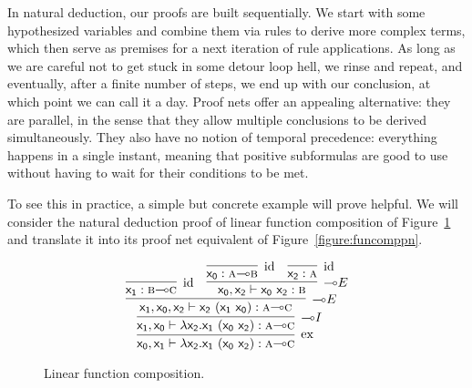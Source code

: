 In natural deduction, our proofs are built sequentially.
We start with some hypothesized variables and combine them via rules to derive more complex terms, which then serve as premises for a next iteration of rule applications.
As long as we are careful not to get stuck in some detour loop hell, we rinse and repeat, and eventually, after a finite number of steps, we end up with our conclusion, at which point we can call it a day.
Proof nets offer an appealing alternative: they are parallel, in the sense that they allow multiple conclusions to be derived simultaneously.
They also have no notion of temporal precedence: everything happens in a single instant, meaning that positive subformulas are good to use without having to wait for their conditions to be met.

To see this in practice, a simple but concrete example will prove helpful.
We will consider the natural deduction proof of linear function composition of Figure~\ref{figure:funcomp} and translate it into its proof net equivalent of Figure~\ref{figure:funcomppn}.

\begin{figure}
	\[
		\infer[\Exchange]{\term{x_0}, \term{x_1} \vdash \term{\lambda x_2.x_1~(x_0~x_2)}: \prop{A} \li \prop{C}}{
			\infer[\li I]{\term{x_1}, \term{x_0} \vdash \term{\lambda x_2.x_1~(x_0~x_2)}: \prop{A} \li \prop{C}}{
				\infer[\li E]{\term{x_1}, \term{x_0}, \term{x_2} \vdash \term{x_2~(x_1~x_0)}: \prop{A} \li \prop{C}}{
					\infer[\Ax]{\term{x_1}:\prop{B}\li\prop{C}}{}
					&
					\infer[\li E]{\term{x_0}, \term{x_2} \vdash \term{x_0~x_2}: \prop{B}}{
						\infer[\Ax]{\term{x_0}: \prop{A}\li\prop{B}}{}
						&
						\infer[\Ax]{\term{x_2}: \prop{A}}{}
					}
				}
			}
		}
	\]
	\caption{Linear function composition.}
	\label{figure:funcomp}
\end{figure}

